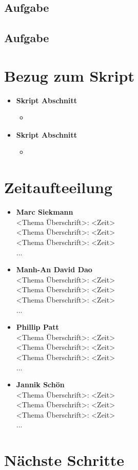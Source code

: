 \documentclass{article}
\begin{document}
\subsection{Aufgabe}


\subsection{Aufgabe}


\section{Bezug zum Skript}

\begin{itemize}
	\item \textbf{Skript Abschnitt}
		\begin{itemize}
			\item 
		\end{itemize}
	\item \textbf{Skript Abschnitt}
		\begin{itemize}
			\item 
		\end{itemize}
\end{itemize}
 
\section{Zeitaufteeilung}

\begin{itemize}
\item \textbf{Marc Siekmann} \\
<Thema Überschrift>: <Zeit> \\ 
<Thema Überschrift>: <Zeit> \\ 
<Thema Überschrift>: <Zeit> \\ 
...

\item \textbf{Manh-An David Dao}\\
<Thema Überschrift>: <Zeit> \\ 
<Thema Überschrift>: <Zeit> \\ 
<Thema Überschrift>: <Zeit> \\ 
...

\item \textbf{Phillip Patt}\\
<Thema Überschrift>: <Zeit> \\ 
<Thema Überschrift>: <Zeit> \\ 
<Thema Überschrift>: <Zeit> \\ 
...

\item \textbf{Jannik Schön}\\
<Thema Überschrift>: <Zeit> \\ 
<Thema Überschrift>: <Zeit> \\ 
<Thema Überschrift>: <Zeit> \\ 
...

\end{itemize}

\section{Nächste Schritte}
\end{document}
